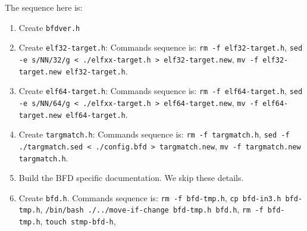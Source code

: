 \begin{enumerate}[noitemsep]
  The sequence here is:
  \begin{enumerate}[noitemsep]
  \item Create \texttt{bfdver.h}
  \item Create \texttt{elf32-target.h}: Commands sequence is: 
    \texttt{rm -f elf32-target.h}, 
    \texttt{sed -e s/NN/32/g < ./elfxx-target.h > elf32-target.new}, 
    \texttt{mv -f elf32-target.new elf32-target.h}.
  \item Create \texttt{elf64-target.h}: Commands sequence is: 
    \texttt{rm -f elf64-target.h}, 
    \texttt{sed -e s/NN/64/g < ./elfxx-target.h > elf64-target.new}, 
    \texttt{mv -f elf64-target.new elf64-target.h}.
  \item Create \texttt{targmatch.h}: Commands sequence is: 
    \texttt{rm -f targmatch.h}, 
    \texttt{sed -f ./targmatch.sed < ./config.bfd > targmatch.new}, 
    \texttt{mv -f targmatch.new targmatch.h}.
  \item Build the BFD specific documentation.  We skip these details.
  \item Create \texttt{bfd.h}.  Commands sequence is: 
    \texttt{rm -f bfd-tmp.h}, 
    \texttt{cp bfd-in3.h bfd-tmp.h}, 
    \texttt{/bin/bash ./../move-if-change bfd-tmp.h bfd.h}, 
    \texttt{rm -f bfd-tmp.h}, 
    \texttt{touch stmp-bfd-h}, 
  \end{enumerate}
\end{enumerate}




